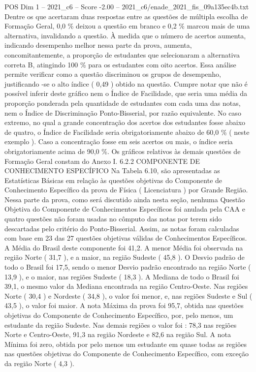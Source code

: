 \begin{textsample}{POS Dim 1 – 2021\_c6 – Score -2.00 – 2021\_c6/enade\_2021\_fis\_09a135ec4b.txt}
Dentre os que acertaram duas respostas entre as questões de múltipla escolha de Formação Geral, 0,0 \% deixou a questão em branco e 0,2 \% marcou mais de uma alternativa, invalidando a questão.
À medida que o número de acertos aumenta, indicando desempenho melhor nessa parte da prova, aumenta, concomitantemente, a proporção de estudantes que selecionaram a alternativa correta B, atingindo 100 \% para os estudantes com oito acertos.
Essa análise permite verificar como a questão discriminou os grupos de desempenho, justificando -se o alto índice ( 0,49 ) obtido na questão.
Cumpre notar que não é possível inferir deste gráfico nem o Índice de Facilidade, que seria uma média da proporção ponderada pela quantidade de estudantes com cada uma das notas, nem o Índice de Discriminação Ponto-Bisserial, por razão equivalente.
No caso extremo, no qual a grande concentração dos acertos dos estudantes fosse abaixo de quatro, o Índice de Facilidade seria obrigatoriamente abaixo de 60,0 \% ( neste exemplo ).
Caso a concentração fosse em seis acertos ou mais, o índice seria obrigatoriamente acima de 90,0 \%.
Os gráficos relativos às demais questões de Formação Geral constam do Anexo I. 6.2.2 COMPONENTE DE CONHECIMENTO ESPECÍFICO Na Tabela 6.10, são apresentadas as Estatísticas Básicas em relação às questões objetivas do Componente de Conhecimento Específico da prova de Física ( Licenciatura ) por Grande Região.
Nessa parte da prova, como será discutido ainda nesta seção, nenhuma Questão Objetiva do Componente de Conhecimentos Específicos foi anulada pela CAA e quatro questões não foram usadas no cômputo das notas por terem sido descartadas pelo critério do Ponto-Bisserial.
Assim, as notas foram calculadas com base em 23 das 27 questões objetivas válidas de Conhecimentos Específicos.
A Média do Brasil deste componente foi 41,2.
A menor Média foi observada na região Norte ( 31,7 ), e a maior, na região Sudeste ( 45,8 ).
O Desvio padrão de todo o Brasil foi 17,5, sendo o menor Desvio padrão encontrado na região Norte ( 13,9 ), e o maior, nas regiões Sudeste ( 18,3 ).
A Mediana de todo o Brasil foi 39,1, o mesmo valor da Mediana encontrada na região Centro-Oeste.
Nas regiões Norte ( 30,4 ) e Nordeste ( 34,8 ), o valor foi menor, e, nas regiões Sudeste e Sul ( 43,5 ), o valor foi maior.
A nota Máxima da prova foi 95,7, obtida nas questões objetivas do Componente de Conhecimento Específico, por, pelo menos, um estudante da região Sudeste.
Nas demais regiões o valor foi : 78,3 nas regiões Norte e Centro-Oeste, 91,3 na região Nordeste e 82,6 na região Sul.
A nota Mínima foi zero, obtida por pelo menos um estudante em quase todas as regiões nas questões objetivas do Componente de Conhecimento Específico, com exceção da região Norte ( 4,3 ).

\end{textsample}
